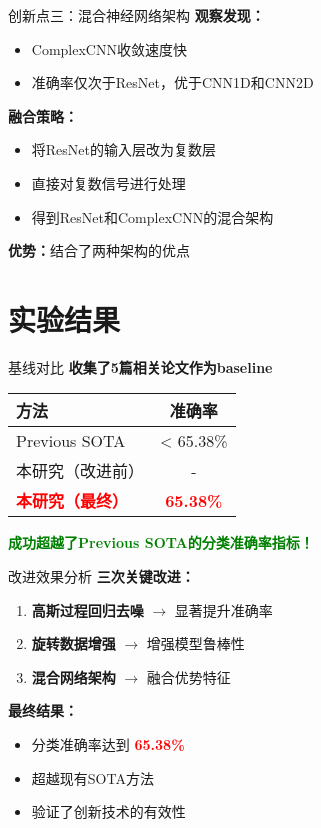\documentclass[aspectratio=169]{beamer}
\begin{document}
\begin{frame}{创新点三：混合神经网络架构}
\textbf{观察发现：}
\begin{itemize}
    \item ComplexCNN收敛速度快
    \item 准确率仅次于ResNet，优于CNN1D和CNN2D
\end{itemize}

\textbf{融合策略：}
\begin{itemize}
    \item 将ResNet的输入层改为复数层
    \item 直接对复数信号进行处理
    \item 得到ResNet和ComplexCNN的混合架构
\end{itemize}

\textbf{优势：}结合了两种架构的优点
\end{frame}

\section{实验结果}

\begin{frame}{基线对比}
\textbf{收集了5篇相关论文作为baseline}

\begin{center}
\begin{tabular}{|l|c|}
\hline
\textbf{方法} & \textbf{准确率} \\
\hline
Previous SOTA & < 65.38\% \\
\hline
本研究（改进前） & - \\
\hline
\textcolor{red}{\textbf{本研究（最终）}} & \textcolor{red}{\textbf{65.38\%}} \\
\hline
\end{tabular}
\end{center}

\vspace{1em}
\textcolor{green}{\textbf{成功超越了Previous SOTA的分类准确率指标！}}
\end{frame}

\begin{frame}{改进效果分析}
\textbf{三次关键改进：}

\begin{enumerate}
    \item \textbf{高斯过程回归去噪} $\rightarrow$ 显著提升准确率
    \item \textbf{旋转数据增强} $\rightarrow$ 增强模型鲁棒性
    \item \textbf{混合网络架构} $\rightarrow$ 融合优势特征
\end{enumerate}

\vspace{1em}
\textbf{最终结果：}
\begin{itemize}
    \item 分类准确率达到 \textcolor{red}{\textbf{65.38\%}}
    \item 超越现有SOTA方法
    \item 验证了创新技术的有效性
\end{itemize}
\end{frame}
\end{document}
